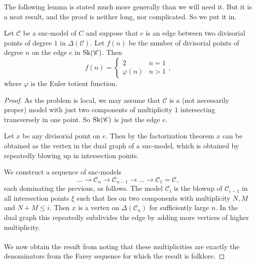 The following lemma is stated much more generally than we will need it. 
But it is a neat result, and the proof is neither long, nor complicated. So we put it in. 
\begin{lemma}\label{lem:number_divisorial_points}
	Let $\mathscr C$ be a snc-model of  $C$ and suppose that $e$ is an edge between two divisorial points of degree $1$ in $\Delta(\mathscr C)$. 
	Let $f(n)$ be the number of divisorial points of degree $n$ on the edge  $e$ in $\operatorname{Sk}(\mathscr C)$. 
	Then \[
		f(n) = \begin{cases}
			2 & n = 1 \\
			\varphi(n) & n > 1
		\end{cases}
	,\] 
	where $\varphi$ is the Euler totient function. 
\end{lemma}
\begin{proof}
	As the problem is local, we may assume that $\mathscr C$ is a (not necessarily proper) model with just two components of multiplicity $1$ intersecting transversely in one point. 
	So $\operatorname{Sk}(\mathscr C)$ is just the edge $e$. 

	Let $x$ be any divisorial point on $e$. 
	Then by the factorization theorem $x$ can be obtained as the vertex in the dual graph of a snc-model, which is obtained by repeatedly blowing up in intersection points. 

	We construct a sequence of snc-models \[
	\ldots \to 	\mathscr C_n \to \mathscr C_{n -1} \to \ldots \to \mathscr C_1 = \mathscr C
,\]
each dominating the previous, as follows. 
The model  $\mathscr C_i$ is the blowup of $\mathscr C_{i-1}$ in all intersection points $\xi$ such that lies on two components with multiplicity $N, M$ and $N + M \le i$. 
Then $x$ is a vertex on $\Delta(\mathscr C_n)$ for sufficiently large $n$.
In the dual graph this repeatedly subdivides the edge by adding more vertices of higher multiplicity. 
\\
\noindent{}
\\
We now obtain the result from noting that these multiplicities are exactly the denominators from the Farey sequence for which the result is folklore. 
\end{proof}


